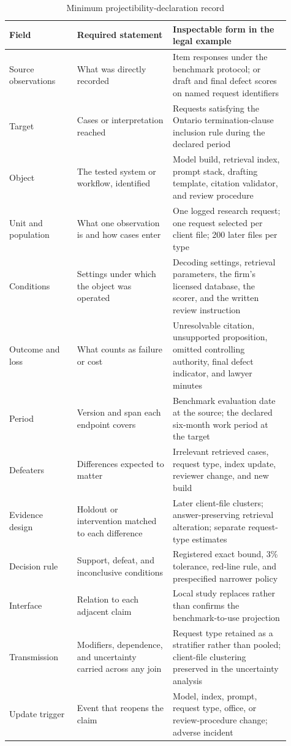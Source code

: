 \documentclass[12pt]{article}
\begin{document}
\begin{table}[tbp]
\centering\small
\caption{Minimum projectibility-declaration record}\label{tab:declaration_fields}
\begin{tabular}{@{}>{\raggedright\arraybackslash}p{0.22\linewidth}
                    >{\raggedright\arraybackslash}p{0.31\linewidth}
                    >{\raggedright\arraybackslash}p{0.38\linewidth}@{}}
\toprule
Field & Required statement & Inspectable form in the legal example \\
\midrule
Source observations & What was directly recorded & Item responses under the benchmark protocol; or draft and final defect scores on named request identifiers \\
Target & Cases or interpretation reached & Requests satisfying the Ontario termination-clause inclusion rule during the declared period \\
Object & The tested system or workflow, identified & Model build, retrieval index, prompt stack, drafting template, citation validator, and review procedure \\
Unit and population & What one observation is and how cases enter & One logged research request; one request selected per client file; 200 later files per type \\
Conditions & Settings under which the object was operated & Decoding settings, retrieval parameters, the firm's licensed database, the scorer, and the written review instruction \\
Outcome and loss & What counts as failure or cost & Unresolvable citation, unsupported proposition, omitted controlling authority, final defect indicator, and lawyer minutes \\
Period & Version and span each endpoint covers & Benchmark evaluation date at the source; the declared six-month work period at the target \\
Defeaters & Differences expected to matter & Irrelevant retrieved cases, request type, index update, reviewer change, and new build \\
Evidence design & Holdout or intervention matched to each difference & Later client-file clusters; answer-preserving retrieval alteration; separate request-type estimates \\
Decision rule & Support, defeat, and inconclusive conditions & Registered exact bound, 3\% tolerance, red-line rule, and prespecified narrower policy \\
Interface & Relation to each adjacent claim & Local study replaces rather than confirms the benchmark-to-use projection \\
Transmission & Modifiers, dependence, and uncertainty carried across any join & Request type retained as a stratifier rather than pooled; client-file clustering preserved in the uncertainty analysis \\
Update trigger & Event that reopens the claim & Model, index, prompt, request type, office, or review-procedure change; adverse incident \\
\bottomrule
\end{tabular}
\end{table}
\end{document}

